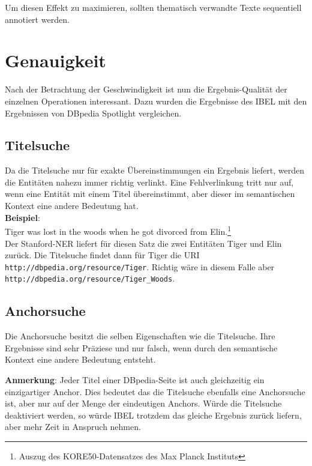 \documentclass[11pt, a4paper, oneside]{Thesis} %
\begin{document}
Um diesen Effekt zu maximieren, sollten thematisch verwandte Texte sequentiell annotiert werden.


\section{Genauigkeit}
Nach der Betrachtung der Geschwindigkeit ist nun die Ergebnis-Qualit\"at der einzelnen Operationen interessant. Dazu wurden die Ergebnisse des IBEL mit den Ergebnissen von DBpedia Spotlight vergleichen.
\subsection{Titelsuche}
Da die Titelsuche nur f\"ur exakte \"Ubereinstimmungen ein Ergebnis liefert, werden die Entit\"aten nahezu immer richtig verlinkt. Eine Fehlverlinkung tritt nur auf, wenn eine Entit\"at mit einem Titel \"ubereinstimmt, aber dieser im semantischen Kontext eine andere Bedeutung hat.\\
\textbf{Beispiel}:\\
Tiger was lost in the woods when he got divorced from Elin.\footnote{Auszug des KORE50-Datensatzes des Max Planck Instituts} \\Der Stanford-NER liefert f\"ur diesen Satz die zwei Entit\"aten Tiger und Elin zur\"uck. Die Titelsuche findet dann f\"ur Tiger die URI \texttt{http://dbpedia.org/resource/Tiger}. Richtig w\"are in diesem Falle aber \texttt{http://dbpedia.org/resource/Tiger\_Woods}.

\subsection{Anchorsuche}
Die Anchorsuche besitzt die selben Eigenschaften wie die Titelsuche. Ihre Ergebnisse sind sehr Pr\"aziese und nur falsch, wenn durch den semantische Kontext eine andere Bedeutung entsteht.

\textbf{Anmerkung}: Jeder Titel einer DBpedia-Seite ist auch gleichzeitig ein einzigartiger Anchor. Dies bedeutet das die Titelsuche ebenfalls eine Anchorsuche ist, aber nur auf der Menge der eindeutigen Anchors. W\"urde die Titelsuche deaktiviert werden, so w\"urde IBEL trotzdem das gleiche Ergebnis zur\"uck liefern, aber mehr Zeit in Anspruch nehmen.   
\end{document}

